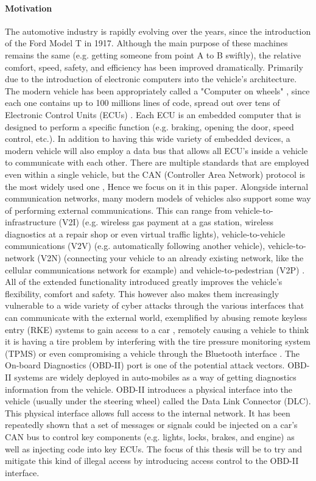 \documentclass[11pt]{article}
\begin{document}
\paragraph{Motivation}
The automotive industry is rapidly evolving over the years, since the introduction of the Ford Model T in 1917. Although the main purpose of these machines remains the same (e.g. getting someone from point A to B swiftly), the relative comfort, speed, safety, and efficiency has been improved dramatically. Primarily due to the introduction of electronic computers into the vehicle's architecture. The modern vehicle has been appropriately called a "Computer on wheels" \cite{Klinedinst05}, since each one contains up to 100 millions lines of code, spread out over tens of Electronic Control Units (ECUs) \cite{Pike15}. Each ECU is an embedded computer that is designed to perform a specific function (e.g. braking, opening the door, speed control, etc.). In addition to having this wide variety of embedded devices, a modern vehicle will also employ a data bus that allows all ECU’s inside a vehicle to communicate with each other. There are multiple standards that are employed even within a single vehicle, but the CAN (Controller Area Network) protocol is the most widely used one \cite{VatiCAN}, Hence we focus on it in this paper. Alongside internal communication networks, many modern models of vehicles also support some way of performing external communications. This can range from vehicle-to-infrastructure (V2I) (e.g. wireless gas payment at a gas station, wireless diagnostics at a repair shop or even virtual traffic lights), vehicle-to-vehicle communications (V2V) (e.g. automatically following another vehicle), vehicle-to-network (V2N) (connecting your vehicle to an already existing network, like the cellular communications network for example) and vehicle-to-pedestrian (V2P) \cite{Kleberger15}\cite{Russel17}\cite{Ahmed}. All of the extended functionality introduced greatly improves the vehicle's flexibility, comfort and safety. This however also makes them increasingly vulnerable to a wide variety of cyber attacks through the various interfaces that can communicate with the external world, exemplified by abusing remote keyless entry (RKE) systems to gain access to a car \cite{KeeLoq}\cite{MillerA}, remotely causing a vehicle to think it is having a tire problem by interfering with the tire pressure monitoring system (TPMS) \cite{MillerA} or even compromising a vehicle through the Bluetooth interface \cite{Checkoway}\cite{Kosher}. The On-board Diagnostics (OBD-II) port is one of the potential attack vectors.  OBD-II systems are widely deployed in auto-mobiles as a way of getting diagnostics information from the vehicle. OBD-II introduces a physical interface into the vehicle (usually under the steering wheel) called the Data Link Connector (DLC). This physical interface allows full access to the internal network. It has been repeatedly shown \cite{MillerA}\cite{Yadav16}\cite{MillerB}\cite{MillerC} that a set of messages or signals could be injected on a car's CAN bus to control key components (e.g. lights, locks, brakes, and engine) as well as injecting code into key ECUs. The focus of this thesis will be to try and mitigate this kind of illegal access by introducing access control to the OBD-II interface.
\end{document}
